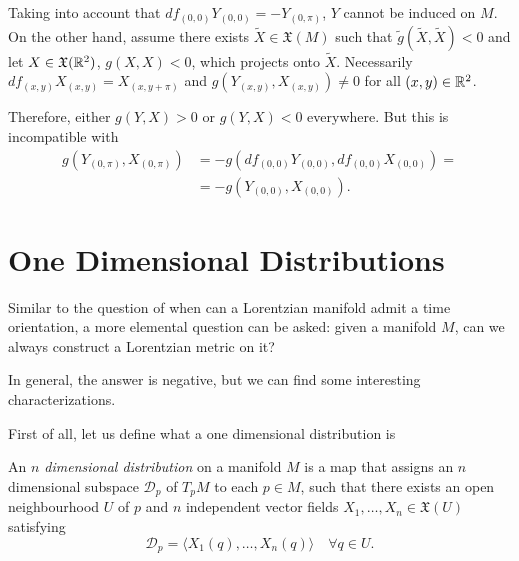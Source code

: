 \begin{example}
	Taking into account that $df_{(0,0)}Y_{(0,0)}=-Y_{(0,\pi)}$, $Y$ cannot be induced on $M$. On the other hand, assume there exists ${\tilde X}\in \mathfrak{X}(M)$ such that ${\tilde g}({\tilde X},{\tilde X})<0$ and let $X\in \mathfrak{X}(\mathbb{R}^2)$, $g(X,X)<0$, which projects onto ${\tilde X}$. Necessarily $df_{(x,y)}X_{(x,y)}=X_{(x,y+\pi)}$ and $g(Y_{(x,y)},X_{(x,y)})\neq 0$ for all $(x,y)\in \mathbb{R}^2$.
	
	Therefore, either $g(Y,X)>0$ or $g(Y,X)<0$ everywhere. But this is incompatible with
	\begin{align*}
	g\left(Y_{(0,\pi)},X_{(0,\pi)}\right) &= -g\left(df_{(0,0)}Y_{(0,0)},df_{(0,0)}X_{(0,0)}\right)=\\
	&= -g\left(Y_{(0,0)},X_{(0,0)}\right).
	\end{align*}
\end{example}

%

\section{One Dimensional Distributions}

Similar to the question of when can a Lorentzian manifold admit a time orientation, a more elemental question can be asked: given a manifold $M$, can we always construct a Lorentzian metric on it?

In general, the answer is negative, but we can find some interesting characterizations.

First of all, let us define what a one dimensional distribution is
\begin{definition}
	An \emph{$n$ dimensional distribution} on a manifold $M$ is a map that assigns an $n$ dimensional subspace $\mathcal{D}_p$ of $T_pM$ to each $p \in M$, such that there exists an open neighbourhood $U$ of $p$ and $n$ independent vector fields $X_1, \dots, X_n \in \mathfrak{X}(U)$ satisfying
	\[
	\mathcal{D}_p = \langle X_1(q), \dots, X_n(q) \rangle \quad \forall q \in U.
	\]
\end{definition}

